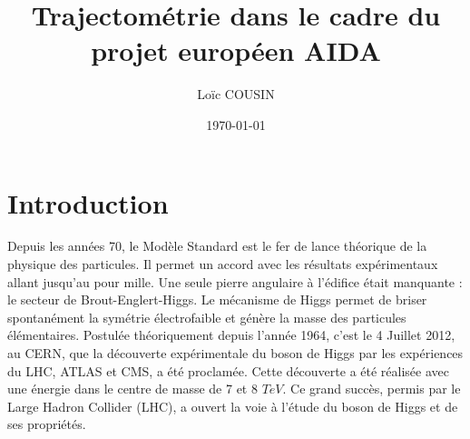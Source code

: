 \documentclass[a4paper,11pt]{report}
\title{Trajectom\'etrie dans le cadre du projet europ\'een AIDA}
\author{Lo\"ic COUSIN}
\date{\today}
\begin{document}
\maketitle

\tableofcontents
\cleardoublepage
{}
\listoffigures



\setcounter{secnumdepth}{2}


\cleardoublepage

\setcounter{page}{1}

\newpage

\chapter*{Introduction}

Depuis les ann\'ees 70, le Mod\`ele Standard est le fer de lance th\'eorique de la physique des particules. Il permet un accord avec les r\'esultats exp\'erimentaux allant jusqu'au pour mille. Une seule pierre angulaire \`a l'\'edifice \'etait manquante : le secteur de Brout-Englert-Higgs. Le m\'ecanisme de Higgs permet de briser spontan\'ement la sym\'etrie \'electrofaible et g\'en\`ere la masse des particules \'el\'ementaires. Postul\'ee th\'eoriquement depuis l'ann\'ee 1964, c'est le 4 Juillet 2012, au CERN, que la d\'ecouverte exp\'erimentale du boson de Higgs par les exp\'eriences du LHC, ATLAS et CMS, a \'et\'e proclam\'ee. Cette d\'ecouverte a \'et\'e r\'ealis\'ee avec une \'energie dans le centre de masse de 7 et 8 $TeV$. Ce grand succ\`es, permis par le Large Hadron Collider (LHC), a ouvert la voie \`a l'\'etude du boson de Higgs et de ses propri\'et\'es.

\medskip
\end{document}
